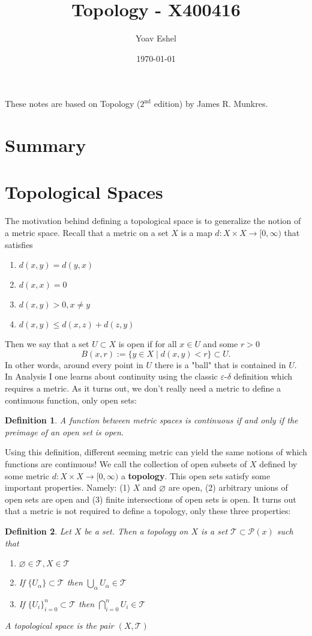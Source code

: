 \documentclass{article}
\title{Topology - X400416}
\author{Yoav Eshel}
\date{\today}
\newcommand{\Ta}{\mathcal{T}}
\newtheorem*{definition}{Definition}
\theoremstyle{remark}
\begin{document}
\maketitle
\tableofcontents
\newpage

These notes are based on Topology ($2^\text{nd}$ edition) by James R. Munkres. 
\section{Summary}
\section{Topological Spaces}
The motivation behind defining a topological space is to generalize the notion of a metric space.
Recall that a metric on a set $X$ is a map $d:X\times X \to [0,\infty)$ that satisfies
\begin{enumerate}
    \item $d(x,y)=d(y,x)$
    \item $d(x,x)=0$
    \item $d(x,y)>0, x\not=y$
    \item $d(x,y)\leq d(x,z)+d(z,y)$
\end{enumerate}
Then we say that a set $U\subset X$ is open if for all $x\in U$ and some $r>0$ 
$$
    B(x,r):=\{y\in X\mid d(x,y)<r\}\subset U.
$$
In other words, around every point in $U$ there is a "ball" that is contained in $U$. 
In Analysis I one learns about continuity using the classic $\varepsilon$-$\delta$ definition which requires a metric.
As it turns out, we don't really need a metric to define a continuous function, only open sets:
\begin{definition}
    A function between metric spaces is continuous if and only if the preimage of an open set is open.
\end{definition}
Using this definition, different seeming metric can yield the same notions of which functions are continuous! 
We call the collection of open subsets of $X$ defined by some metric $d:X\times X\to [0,\infty)$ a \textbf{topology}.
This open sets satisfy some important properties. Namely: (1) $X$ and $\varnothing$ are open, (2) arbitrary unions of open sets are open and (3) finite intersections of open sets is open.
It turns out that a metric is not required to define a topology, only these three properties:
\begin{definition}
    Let $X$ be a set. Then a topology on $X$ is a set $\mathcal{T}\subset\mathcal{P}(x)$ such that
    \begin{enumerate}
        \item $\varnothing\in\Ta, X\in\Ta$
        \item If $\{U_{\alpha}\}\subset\Ta$ then  $\bigcup_{\alpha}U_{\alpha}\in\Ta$
        \item If $\{U_i\}_{i=0}^n\subset\Ta$ then $\bigcap_{i=0}^n U_i\in\Ta$
    \end{enumerate}
    A topological space is the pair $(X,\Ta)$
\end{definition}
\end{document}
